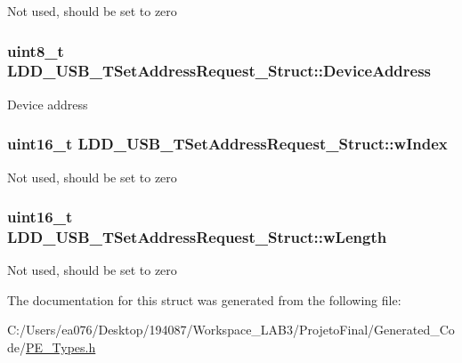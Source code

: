 Not used, should be set to zero \hypertarget{struct_l_d_d___u_s_b___t_set_address_request___struct_ac55059f77c050ba97d5f0d9b2b3a52c9}{
\subsubsection[{Device\-Address}]{\setlength{\rightskip}{0pt plus 5cm}uint8\-\_\-t L\-D\-D\-\_\-\-U\-S\-B\-\_\-\-T\-Set\-Address\-Request\-\_\-\-Struct\-::\-Device\-Address}}\label{struct_l_d_d___u_s_b___t_set_address_request___struct_ac55059f77c050ba97d5f0d9b2b3a52c9}
Device address \hypertarget{struct_l_d_d___u_s_b___t_set_address_request___struct_ab6a26adfbbc2e164679a4d7dcf5c99d0}{
\subsubsection[{w\-Index}]{\setlength{\rightskip}{0pt plus 5cm}uint16\-\_\-t L\-D\-D\-\_\-\-U\-S\-B\-\_\-\-T\-Set\-Address\-Request\-\_\-\-Struct\-::w\-Index}}\label{struct_l_d_d___u_s_b___t_set_address_request___struct_ab6a26adfbbc2e164679a4d7dcf5c99d0}
Not used, should be set to zero \hypertarget{struct_l_d_d___u_s_b___t_set_address_request___struct_adff24e6d3ec27fce1f59693aa215deda}{
\subsubsection[{w\-Length}]{\setlength{\rightskip}{0pt plus 5cm}uint16\-\_\-t L\-D\-D\-\_\-\-U\-S\-B\-\_\-\-T\-Set\-Address\-Request\-\_\-\-Struct\-::w\-Length}}\label{struct_l_d_d___u_s_b___t_set_address_request___struct_adff24e6d3ec27fce1f59693aa215deda}
Not used, should be set to zero 

The documentation for this struct was generated from the following file\-:\begin{DoxyCompactItemize}
\item 
C\-:/\-Users/ea076/\-Desktop/194087/\-Workspace\-\_\-\-L\-A\-B3/\-Projeto\-Final/\-Generated\-\_\-\-Code/\hyperlink{_p_e___types_8h}{P\-E\-\_\-\-Types.\-h}\end{DoxyCompactItemize}
